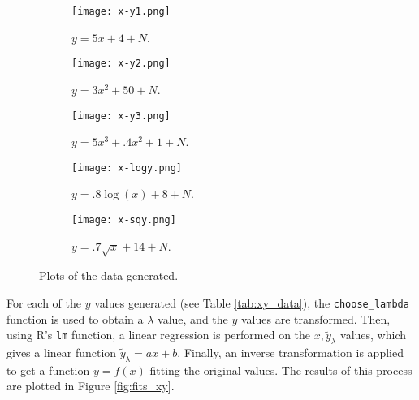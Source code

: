 \documentclass[letterpaper, 10 pt, conference]{article}
\begin{document}
\begin{figure}
	\centering
	\begin{subfigure}{0.3\linewidth}
		\texttt{[image: x-y1.png]}
		\caption{$y = 5x+4+ N$.}
		\label{fig:xy_data_1}
	\end{subfigure}
	\hfill
	\begin{subfigure}{0.3\linewidth}
		\texttt{[image: x-y2.png]}
		\caption{$y = 3x^2 + 50 + N$.}
		\label{fig:xy_data_2}
	\end{subfigure}
	\hfill
	\begin{subfigure}{0.3\linewidth}
		\texttt{[image: x-y3.png]}
		\caption{$y = 5x^3 + .4 x^2 + 1 + N$.}
		\label{fig:xy_data_3}
	\end{subfigure}
	\begin{subfigure}{0.45\linewidth}
	\texttt{[image: x-logy.png]}
	\caption{$y = .8 \log(x) + 8 + N$.}
	\label{fig:xy_data_log}
	\end{subfigure}
	\hfill
	\begin{subfigure}{0.45\linewidth}
		\texttt{[image: x-sqy.png]}
		\caption{$y = .7 \sqrt{x} + 14 +N $.}
		\label{fig:xy_data_sq}
	\end{subfigure}
	\caption{Plots of the data generated.} 
	\label{fig:xy_data}
\end{figure}

For each of the $y$ values generated (see Table \ref{tab:xy_data}), the \texttt{choose\_lambda} function is used to obtain a $\lambda$ value, and the $y$ values are transformed. Then, using R's \texttt{lm} function, a linear regression is performed on the $x, \tilde{y}_\lambda$ values, which gives a linear function $\tilde{y}_\lambda = a x + b$.  Finally, an inverse transformation is applied to get a function $y = f(x)$ fitting the original values. The results of this process are plotted in Figure \ref{fig:fits_xy}.
\end{document}
